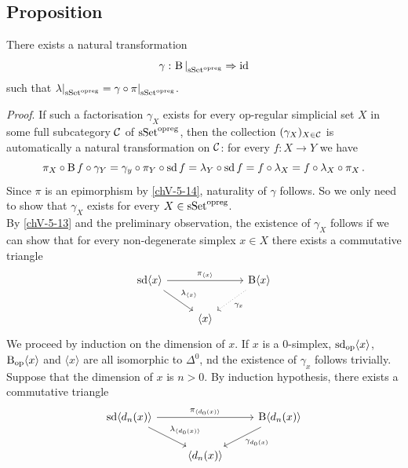     \subsection{Proposition}\label{chV-5-19}
        There exists a natural transformation
        \begin{equation*}
            \gamma \,\colon {\operatorname{B}|}_{\operatorname{sSet}^{\operatorname{opreg}}} \Rightarrow \operatorname{id}
        \end{equation*}
        such that ${\lambda|}_{\operatorname{sSet}^{\operatorname{opreg}}} = \gamma \circ {\pi|}_{\operatorname{sSet}^{\operatorname{opreg}}}$.
        \smallskip

        \emph{Proof}. If such a factorisation $\gamma_X$ exists for every op-regular simplicial set $X$ in some full subcategory $\mathcal{C}$ of $\operatorname{sSet}^{\operatorname{opreg}}$, then the collection $(\gamma_X)_{X \in \mathcal{C}}$ is automatically a natural transformation on $\mathcal{C}$: for every $f \colon X \to Y$ we have
        \begin{equation*}
            \pi_X \circ \operatorname{B} f \circ \gamma_Y = \gamma_y \circ \pi_Y \circ \operatorname{sd} f = \lambda_Y \circ \operatorname{sd} f = f \circ \lambda_X = f \circ \lambda_X \circ \pi_X \,.
        \end{equation*}
        Since $\pi$ is an epimorphism by \ref{chV-5-14}, naturality of $\gamma$ follows. So we only need to show that $\gamma_X$ exists for every $X \in \operatorname{sSet}^{\operatorname{opreg}}$.\\
        By \ref{chV-5-13} and the preliminary observation, the existence of $\gamma_X$ follows if we can show that for every non-degenerate simplex $x \in X$ there exists a commutative triangle
        \begin{equation*}
            \begin{tikzcd}
                \sd \langle x \rangle \arrow[dr, "\lambda_{\langle x \rangle}"] \arrow[rr, "\pi_{\langle x \rangle}"] & & \B \langle x \rangle \arrow[dl, dotted, "\gamma_x"] \\
                & \langle x \rangle &
            \end{tikzcd}
        \end{equation*}
        We proceed by induction on the dimension of $x$. If $x$ is a $0$-simplex, $\operatorname{sd}_{\operatorname{op}} \langle x \rangle$, $\operatorname{B}_{\operatorname{op}} \langle x \rangle$ and $\langle x \rangle$ are all isomorphic to $\Delta^0$, nd the existence of $\gamma_x$ follows trivially.\\
        Suppose that the dimension of $x$ is $n > 0$. By induction hypothesis, there exists a commutative triangle
        \begin{equation*}
            \begin{tikzcd}
                \sd \langle d_n(x) \rangle \arrow[dr, "{\lambda_{\langle d_0(x) \rangle}}"] \arrow[rr, "{\pi_{\langle d_0(x) \rangle}}"] & & \B \langle d_n(x) \rangle \arrow[dl, "{\gamma_{d_0(x)}}"] \\
                & \langle d_n(x) \rangle &
            \end{tikzcd}
        \end{equation*}
